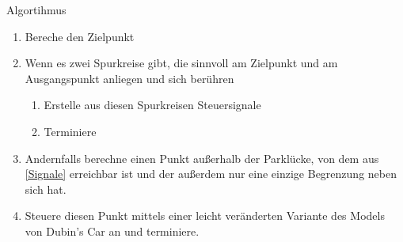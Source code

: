 \begin{frame}{Algortihmus}

\begin{enumerate}
	\item Bereche den Zielpunkt
	\item Wenn es zwei Spurkreise gibt, die sinnvoll am Zielpunkt und am Ausgangspunkt anliegen und sich berühren
  \begin{enumerate}
		\item Erstelle aus diesen Spurkreisen Steuersignale \label{Signale}
		\item Terminiere
	\end{enumerate}
	\item Andernfalls berechne einen Punkt außerhalb der Parklücke, von dem aus \ref{Signale} erreichbar ist und der außerdem nur eine einzige Begrenzung neben sich hat.
	\item Steuere diesen Punkt mittels einer leicht veränderten Variante des Models von Dubin's Car an und terminiere. 
\end{enumerate}

\end{frame}